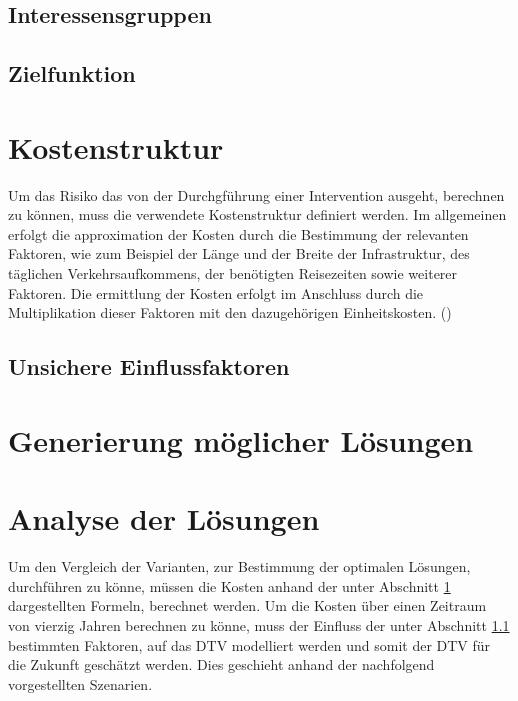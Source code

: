 	\subsection{Interessensgruppen}
	

	\subsection{Zielfunktion}
	
	
\pagebreak

\section{Kostenstruktur}
\label{sec:Kostenstruktur}

Um das Risiko das von der Durchgführung einer Intervention ausgeht, berechnen zu können, muss die verwendete Kostenstruktur definiert werden. 
Im allgemeinen erfolgt die approximation der Kosten durch die Bestimmung der relevanten Faktoren, wie zum Beispiel der Länge und der Breite der Infrastruktur, des täglichen Verkehrsaufkommens, der benötigten Reisezeiten sowie weiterer Faktoren. Die ermittlung der Kosten erfolgt im Anschluss durch die Multiplikation dieser Faktoren mit den dazugehörigen Einheitskosten. (\cite{Adey2012}) 


	
	
	\subsection{Unsichere Einflussfaktoren}
	\label{subsec:Uncertain}
	



\section{Generierung möglicher Lösungen}
\label{sec:Varianten}



\section{Analyse der Lösungen}
\label{sec:Analyse}

Um den Vergleich der Varianten, zur Bestimmung der optimalen Lösungen, durchführen zu könne, müssen die Kosten anhand der unter Abschnitt \ref{sec:Kostenstruktur} dargestellten Formeln, berechnet werden. Um die Kosten über einen Zeitraum von vierzig Jahren berechnen zu könne, muss der Einfluss der unter Abschnitt \ref{subsec:Uncertain} bestimmten Faktoren, auf das DTV modelliert werden und somit der DTV für die Zukunft geschätzt werden. Dies geschieht anhand der nachfolgend vorgestellten Szenarien.


